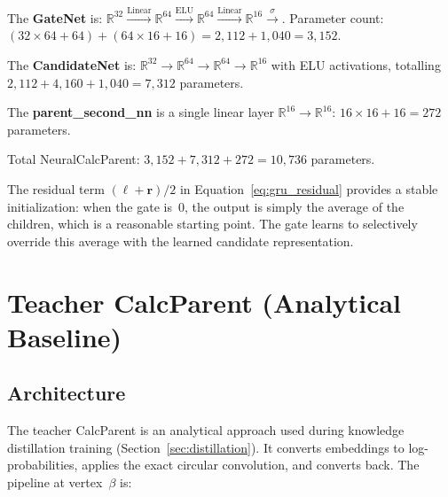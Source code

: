 \documentclass[11pt,a4paper]{article}
\newcommand{\R}{\mathbb{R}}
\begin{document}
The \textbf{GateNet} is: $\R^{32} \xrightarrow{\text{Linear}} \R^{64} \xrightarrow{\text{ELU}} \R^{64} \xrightarrow{\text{Linear}} \R^{16} \xrightarrow{\sigma}$. Parameter count: $(32 \times 64 + 64) + (64 \times 16 + 16) = 2{,}112 + 1{,}040 = 3{,}152$.

The \textbf{CandidateNet} is: $\R^{32} \to \R^{64} \to \R^{64} \to \R^{16}$ with ELU activations, totalling $2{,}112 + 4{,}160 + 1{,}040 = 7{,}312$ parameters.

The \textbf{parent\_second\_nn} is a single linear layer $\R^{16} \to \R^{16}$: $16 \times 16 + 16 = 272$ parameters.

Total NeuralCalcParent: $3{,}152 + 7{,}312 + 272 = 10{,}736$ parameters.

The residual term $(\bm{\ell} + \bm{r}) / 2$ in Equation~\eqref{eq:gru_residual} provides a stable initialization: when the gate is~0, the output is simply the average of the children, which is a reasonable starting point. The gate learns to selectively override this average with the learned candidate representation.

\section{Teacher CalcParent (Analytical Baseline)}
\label{sec:soft_bit_bridge}

\subsection{Architecture}

The teacher CalcParent is an analytical approach used during knowledge distillation training (Section~\ref{sec:distillation}). It converts embeddings to log-probabilities, applies the exact circular convolution, and converts back. The pipeline at vertex~$\beta$ is:
\end{document}
